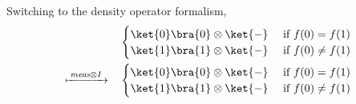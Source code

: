  Switching to the density operator formalism,
  \begin{equation}
    \begin{split}
      &\begin{cases}
        \ket{0} \bra{0} \otimes \ket{-}  &\text{ if }   f(0)= f(1) \\
       \ket{1}  \bra{1} \otimes \ket{-} &\text{ if }   f(0) \neq f(1) 
     \end{cases} \\
  \xmapsto{ \hspace{2pt} \textit{meas} \otimes I \hspace{2pt}} \quad &
  \begin{cases}
     \ket{0} \bra{0} \otimes \ket{-}  &\text{ if }   f(0)= f(1) \\
    \ket{1}  \bra{1} \otimes \ket{-} &\text{ if }   f(0) \neq f(1) 
  \end{cases} \\
  \end {split}
\end{equation} 

